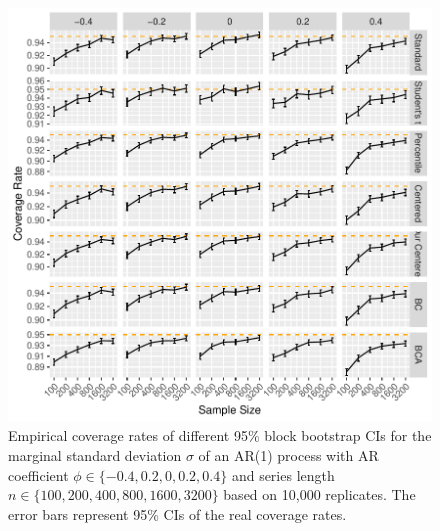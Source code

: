 \documentclass[12pt, letterpaper, titlepage]{article}
\begin{document}
\begin{figure}[tbp]
  \centering
  \includegraphics[width=\textwidth]{figures/plot_sigma}
  \caption{Empirical coverage rates of different 95\% block bootstrap CIs for
    the marginal standard deviation $\sigma$ of an AR(1) process with AR
    coefficient $\phi \in \{-0.4, 0.2, 0, 0.2, 0.4\}$ and series length
    $n \in \{100, 200, 400, 800, 1600, 3200\}$ based on 10,000 replicates.
    The error bars represent 95\% CIs of the real coverage rates.}
  \label{fig:sigma}
\end{figure}
\end{document}
